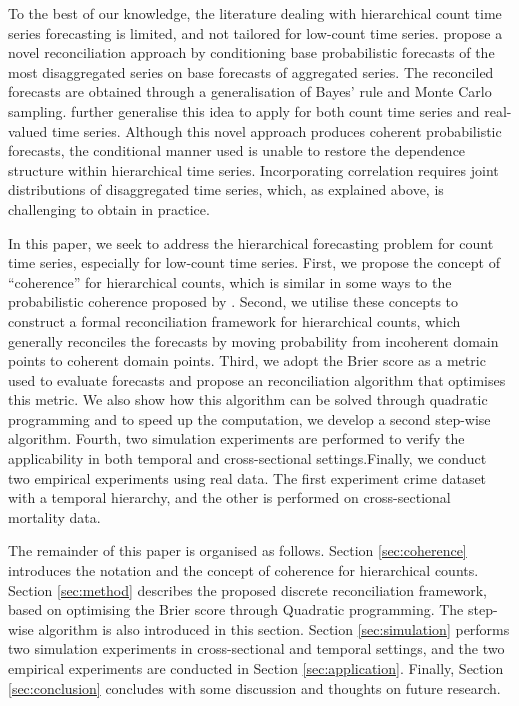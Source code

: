 \documentclass[a4paper,review,12pt,authoryear]{elsarticle}
\begin{document}
To the best of our knowledge, the literature dealing with hierarchical count time series forecasting is limited, and not tailored for low-count time series.
\cite{coraniProbabilisticReconciliationCount2022} propose a novel reconciliation approach by conditioning base probabilistic forecasts of the most disaggregated series on base forecasts of aggregated series. 
The reconciled forecasts are obtained through a generalisation of Bayes’ rule and Monte Carlo sampling.
\cite{zambonEfficientProbabilisticReconciliation2022} further generalise this idea to apply for both count time series and real-valued time series.
Although this novel approach produces coherent probabilistic forecasts, 
the conditional manner used is unable to restore the dependence structure within hierarchical time series.
Incorporating correlation requires joint distributions of disaggregated time series, which, as explained above, is challenging to obtain in practice.

In this paper, we seek to address the hierarchical forecasting problem for count time series, especially for low-count time series.
First, we propose the concept of ``coherence'' for hierarchical counts, 
which is similar in some ways to the probabilistic coherence proposed by \cite{panagiotelisProbabilisticForecastReconciliation2022}.
Second, we utilise these concepts to construct a formal reconciliation framework for hierarchical counts, which generally reconciles the forecasts by moving probability from incoherent domain points to coherent domain points.
Third, we adopt the Brier score as a metric used to evaluate forecasts and propose an reconciliation algorithm that optimises this metric. We also show how this algorithm can be solved through quadratic programming and to speed up the computation, we develop a second step-wise algorithm. Fourth, two simulation experiments are performed to verify the applicability  in both temporal and cross-sectional settings.Finally, we conduct two empirical experiments using real data. The first experiment crime dataset with a temporal hierarchy, and the other is performed on cross-sectional mortality data.

The remainder of this paper is organised as follows. 
Section \ref{sec:coherence} introduces the notation and the concept of coherence for hierarchical counts.
Section \ref{sec:method} describes the proposed discrete reconciliation framework, based on optimising the Brier score through Quadratic programming. The step-wise algorithm is also introduced in this section. Section \ref{sec:simulation} performs two simulation experiments in cross-sectional and temporal settings, and the two empirical experiments are conducted in Section \ref{sec:application}. Finally, Section \ref{sec:conclusion} concludes with some discussion and thoughts on future research.
\end{document}
